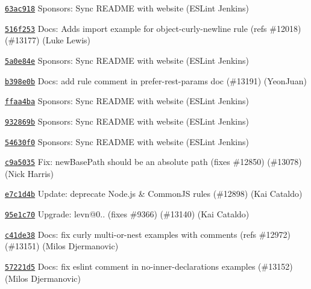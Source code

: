\begin{DoxyItemize}
\item \href{https://github.com/eslint/eslint/commit/63ac91877668205aaa50495a9615806967e6e4cf}{\texttt{ {\ttfamily 63ac918}}} Sponsors\+: Sync README with website (ESLint Jenkins)
\item \href{https://github.com/eslint/eslint/commit/516f253729daeeb9da5de5e9b38606ff9c1aae71}{\texttt{ {\ttfamily 516f253}}} Docs\+: Adds import example for object-\/curly-\/newline rule (refs \#12018) (\#13177) (Luke Lewis)
\item \href{https://github.com/eslint/eslint/commit/5a0e84e9498a946a3e8491a370e012354e087fe0}{\texttt{ {\ttfamily 5a0e84e}}} Sponsors\+: Sync README with website (ESLint Jenkins)
\item \href{https://github.com/eslint/eslint/commit/b398e0b9ff455e4e7d70f19d5ccea5819c21eb86}{\texttt{ {\ttfamily b398e0b}}} Docs\+: add rule comment in prefer-\/rest-\/params doc (\#13191) (Yeon\+Juan)
\item \href{https://github.com/eslint/eslint/commit/ffaa4ba5e2bb1a51a78a2b2c028cbe2efc9e5165}{\texttt{ {\ttfamily ffaa4ba}}} Sponsors\+: Sync README with website (ESLint Jenkins)
\item \href{https://github.com/eslint/eslint/commit/932869b3251b04c4ad5fa72279cb2a56a3e67b55}{\texttt{ {\ttfamily 932869b}}} Sponsors\+: Sync README with website (ESLint Jenkins)
\item \href{https://github.com/eslint/eslint/commit/54630f0063fa66318476473757b5912465d4caf2}{\texttt{ {\ttfamily 54630f0}}} Sponsors\+: Sync README with website (ESLint Jenkins)
\item \href{https://github.com/eslint/eslint/commit/c9a503571a4662f6c2d31cabc7fd7819ec388150}{\texttt{ {\ttfamily c9a5035}}} Fix\+: new\+Base\+Path should be an absolute path (fixes \#12850) (\#13078) (Nick Harris)
\item \href{https://github.com/eslint/eslint/commit/e7c1d4b2ac56149a517d4b0000230348a641f1d3}{\texttt{ {\ttfamily e7c1d4b}}} Update\+: deprecate Node.\+js \& Common\+JS rules (\#12898) (Kai Cataldo)
\item \href{https://github.com/eslint/eslint/commit/95e1c70cebde210a990ee786ec7ab1c8e522edb8}{\texttt{ {\ttfamily 95e1c70}}} Upgrade\+: levn@0.. (fixes \#9366) (\#13140) (Kai Cataldo)
\item \href{https://github.com/eslint/eslint/commit/c41de382a330d4789488fd2dcf6db5a3163bb5d2}{\texttt{ {\ttfamily c41de38}}} Docs\+: fix curly multi-\/or-\/nest examples with comments (refs \#12972) (\#13151) (Milos Djermanovic)
\item \href{https://github.com/eslint/eslint/commit/57221d58c60e757062242f30ed574e0502fc7c31}{\texttt{ {\ttfamily 57221d5}}} Docs\+: fix eslint comment in no-\/inner-\/declarations examples (\#13152) (Milos Djermanovic)

\end{DoxyItemize}
